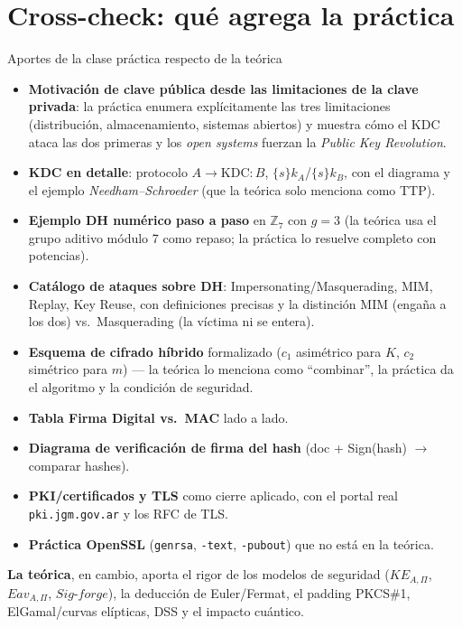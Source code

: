 \documentclass[11pt,a4paper]{article}
\newcommand{\Zn}{\mathbb{Z}}
\begin{document}
\section{Cross-check: qué agrega la práctica}

\begin{practbox}{Aportes de la clase práctica respecto de la teórica}
\begin{itemize}[leftmargin=1.4em,itemsep=3pt]
  \item \textbf{Motivación de clave pública desde las limitaciones de la clave privada}: la
        práctica enumera explícitamente las tres limitaciones (distribución, almacenamiento,
        sistemas abiertos) y muestra cómo el KDC ataca las dos primeras y los \emph{open
        systems} fuerzan la \emph{Public Key Revolution}.
  \item \textbf{KDC en detalle}: protocolo $A\to\text{KDC}:B$, $\{s\}k_A$/$\{s\}k_B$, con el
        diagrama y el ejemplo \emph{Needham--Schroeder} (que la teórica solo menciona como TTP).
  \item \textbf{Ejemplo DH numérico paso a paso} en $\Zn_7$ con $g=3$ (la teórica usa el grupo
        aditivo módulo 7 como repaso; la práctica lo resuelve completo con potencias).
  \item \textbf{Catálogo de ataques sobre DH}: Impersonating/Masquerading, MIM, Replay, Key
        Reuse, con definiciones precisas y la distinción MIM (engaña a los dos) vs.\
        Masquerading (la víctima ni se entera).
  \item \textbf{Esquema de cifrado híbrido} formalizado ($c_1$ asimétrico para $K$, $c_2$
        simétrico para $m$) — la teórica lo menciona como ``combinar'', la práctica da el
        algoritmo y la condición de seguridad.
  \item \textbf{Tabla Firma Digital vs.\ MAC} lado a lado.
  \item \textbf{Diagrama de verificación de firma del hash} (doc + Sign(hash) $\to$
        comparar hashes).
  \item \textbf{PKI/certificados y TLS} como cierre aplicado, con el portal real
        \texttt{pki.jgm.gov.ar} y los RFC de TLS.
  \item \textbf{Práctica OpenSSL} (\texttt{genrsa}, \texttt{-text}, \texttt{-pubout}) que no
        está en la teórica.
\end{itemize}
\textbf{La teórica}, en cambio, aporta el rigor de los modelos de seguridad ($KE_{A,\Pi}$,
$Eav_{A,\Pi}$, $\textit{Sig-forge}$), la deducción de Euler/Fermat, el padding PKCS\#1,
ElGamal/curvas elípticas, DSS y el impacto cuántico.
\end{practbox}
\end{document}
